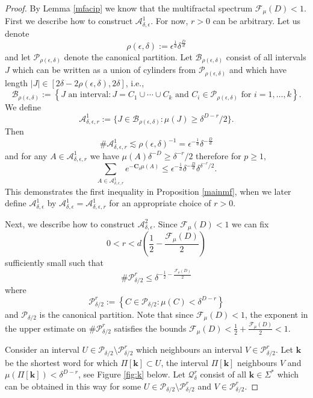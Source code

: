 \documentclass[11pt, reqno]{amsart}
\numberwithin{equation}{section}
\theoremstyle{plain}%
\theoremstyle{definition}
\def\F{\ensuremath{\mathcal F}}
\def\A{\ensuremath{\mathscr A}}
\renewcommand{\A}{\mathcal{A}}
\renewcommand{\F}{\mathcal{F}}
\theoremstyle{nonumberplain}
\begin{document}
\begin{proof}
By Lemma \ref{mfacip} we know that the multifractal spectrum $\F_\mu(D)<1$. First we describe how to construct $ \A^1_{\delta,\epsilon}$. For now, $r>0$ can be arbitrary. Let us denote 
$$\rho(\epsilon,\delta):=\epsilon^{\frac{1}{d}}\delta^{\frac{D}{d}}$$ and let $\mathscr{P}_{\rho(\epsilon,\delta)}$ denote the canonical partition. Let $\mathcal{B}_{\rho(\epsilon,\delta)}$ consist of all intervals $J$ which can be written as a union of cylinders from $\mathscr{P}_{\rho(\epsilon,\delta)}$ and which have length $|J| \in [2\delta-2\rho(\epsilon,\delta), 2\delta]$, i.e., 
$$\mathcal{B}_{\rho(\epsilon,\delta)}:= \left\{ J \text{ an interval}: J= C_1\cup\cdots \cup C_k \text{ and } C_i\in \mathscr{P}_{\rho(\epsilon,\delta)} \text{ for } i=1, \ldots, k\right\}.$$
 We define
$$\A^1_{\delta,\epsilon,r}:=\{J \in \mathcal{B}_{\rho(\epsilon,\delta)}: \mu(J) \geq \delta^{D-r}/2\}.$$
Then 
$$\#\A^1_{\delta,\epsilon,r} \lesssim \rho(\epsilon,\delta)^{-1}=\epsilon^{-\frac{1}{d}}\delta^{-\frac{D}{d}}$$
and for any $A \in \A^1_{\delta,\epsilon,r}$ we have $\mu(A)\delta^{-D} \geq \delta^{-r}/2$ therefore for $p \geq 1$,
$$\sum_{A \in \A^1_{\delta,\epsilon,r}} e^{-\mathbf{C}_\delta \mu(A)} \leq \epsilon^{-\frac{1}{d}}\delta^{-\frac{D}{d}}\delta^{\delta^{-r}/2}.$$
This demonstrates the first inequality in Proposition \ref{mainmf}, when we later define $\A^1_{\delta,\epsilon}$ by $\A^1_{\delta,\epsilon}=\A^1_{\delta,\epsilon,r}$ for an appropriate choice of $r>0$. 

Next, we describe how to construct $ \A^2_{\delta,\epsilon}$. Since $\F_\mu(D)<1$ we can fix 
$$0<r<d\left(\frac{1}{2}-\frac{\F_\mu(D)}{2}\right)$$
sufficiently small such that 
$$\#\mathscr{P}_{\delta/2}^r \leq \delta^{-\frac{1}{2}-\frac{\F_\mu(D)}{2}}$$
 where
$$\mathscr{P}_{\delta/2}^r:=\left\{C \in \mathscr{P}_{\delta/2}: \mu(C) < \delta^{D-r}\right\}$$
and $\mathscr{P}_{\delta/2}$ is the canonical partition. Note that since $\F_\mu(D)<1$, the exponent in the upper estimate on $\#\mathscr{P}_{\delta/2}^r$ satisfies the bounds $\F_\mu(D)< \frac{1}{2}+\frac{\F_\mu(D)}{2}<1.$


Consider an interval $U \in\mathscr{P}_{\delta/2} \setminus\mathscr{P}_{\delta/2}^r$ which neighbours an interval $V \in\mathscr{P}_{\delta/2}^r$. Let $\mathbf{k}$ be the shortest word for which $\Pi[\mathbf{k}] \subset U$, the interval $\Pi[\mathbf{k}]$  neighbours $V$ and  $\mu(\Pi[\mathbf{k}])<\delta^{D-r}$, see Figure \ref{fig:k} below. Let $\mathcal{Q}_\delta^r$ consist of all $\mathbf{k}\in \Sigma^*$ which can be obtained in this way for some $U \in\mathscr{P}_{\delta/2} \setminus\mathscr{P}_{\delta/2}^r$ and $V \in\mathscr{P}_{\delta/2}^r$. 


\end{proof}
\end{document}
